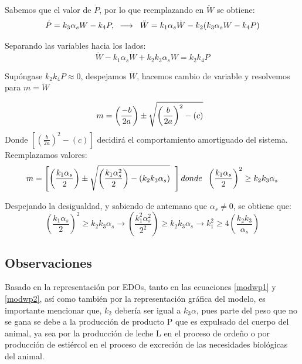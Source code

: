 Sabemos que el valor de $\dot{P}$, por lo que reemplazando en $\ddot{W}$ se obtiene:
\begin{equation*}
    \dot{P} = k_{3}\alpha_{s}W - k_{4}P, \hspace{0.2cm}\longrightarrow\hspace{0.2cm} \ddot{W} = k_{1}\alpha_{s}\dot{W} - k_{2}(k_{3}\alpha_{s}W - k_{4}P)
\end{equation*}

Separando las variables hacia los lados:
\begin{equation}
    \ddot{W}- k_{1}\alpha_{s}\dot{W} + k_{2}k_{3}\alpha_{s}W = k_{2}k_{4}P
\end{equation}

Supóngase  $k_{2}k_{4}P\approx 0$, despejamos $\ddot{W}$, hacemos cambio de variable y resolvemos para $m = \ddot{W}$

\begin{equation}
    m=\left(\frac{-b}{2a}\right) \pm \sqrt{\left(\frac{b}{2a}\right)^{2}-(c)} \hspace{0.2cm}
\end{equation}
Donde $\left[\left(\frac{b}{2a}\right)^{2} - (c)\right]$ decidirá el comportamiento amortiguado del sistema. Reemplazamos valores:
\begin{equation}
    m=\left[\left(\frac{k_{1}\alpha_{s}}{2}\right)\pm\sqrt{\left(\frac{k_{1}\alpha_{s}^{2}}{2}\right)-(k_{2}k_{3}\alpha_{s})} \hspace{0.2cm}\right] donde \hspace{0.2cm} \left(\frac{k_{1}\alpha_{s}}{2}\right)^{2}\geq k_{2}k_{3}\alpha_{s}
\end{equation}

Despejando la desigualdad, y sabiendo de antemano que
 $\alpha_{s}\neq 0$, se obtiene que:
\begin{equation} \label{relacionkis}
    \left(\frac{k_{1}\alpha_{s}}{2}\right)^{2}\geq k_{2}k_{3}\alpha_{s} \longrightarrow \left(\frac{k_{1}^{2}\alpha_{s}^{2}}{2^{2}}\right)\geq k_{2}k_{3}\alpha_{s} \longrightarrow k_{1}^{2}\geq 4\left(\frac{k_{2}k_{3}}{\alpha_{s}}\right)
\end{equation}
\subsection{Observaciones}
Basado en la representación por EDOs, tanto en las ecuaciones \ref{modwp1} y \ref{modwp2}, así como también por la representación gráfica del modelo, es importante mencionar que, $k_{2}$ debería ser igual a $k_{3}\alpha$, pues parte del peso que no se gana se debe a la producción de producto P que es expulsado del cuerpo del animal, ya sea por la producción de leche L en el proceso de ordeño o por producción de estiércol en el proceso de excreción de las necesidades biológicas del animal. \\

